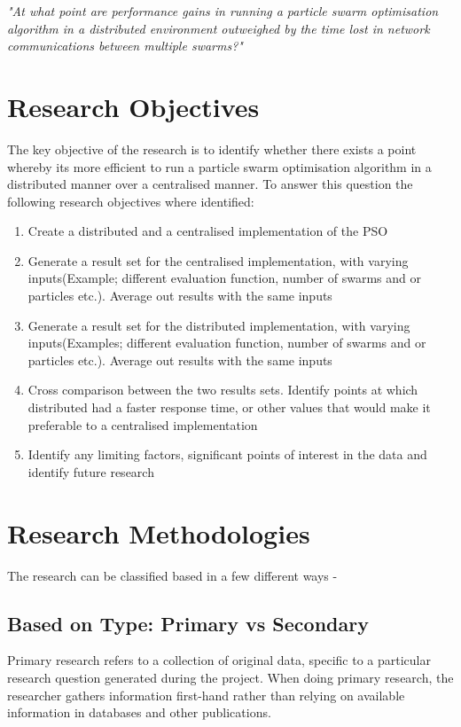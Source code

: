 \documentclass[oneside,12pt]{book}
\begin{document}
\textit{"At what point are performance gains in running a particle swarm optimisation algorithm in a distributed environment outweighed by the time lost in network communications between multiple swarms?"}

\section{Research Objectives}
The key objective  of  the  research  is  to  identify  whether  there exists a point whereby its more efficient to run a particle swarm optimisation algorithm in a distributed manner over a centralised manner. To answer this question the following research objectives where identified:
\begin{enumerate}
\item Create a distributed and a centralised implementation of the PSO
\item Generate a result set for the centralised implementation, with varying inputs(Example; different evaluation function, number of swarms and or particles etc.). Average out results with the same inputs
\item Generate a result set for the distributed implementation, with varying inputs(Examples; different evaluation function, number of swarms and or particles etc.). Average out results with the same inputs
\item Cross comparison between the two results sets. Identify points at which distributed had a faster response time, or other values that would make it preferable to  a centralised implementation
\item Identify any limiting factors, significant points of interest in the data and identify future research
\end{enumerate}


\section{Research Methodologies}
The research can be classified based in a few different ways -
\subsection{Based on Type: Primary vs Secondary}
Primary research refers to a collection of original data, specific to a particular research question generated during the project. When doing primary research, the researcher gathers information first-hand rather than relying on available information in databases and other publications.\cite{bouchrika_2020}
\end{document}
